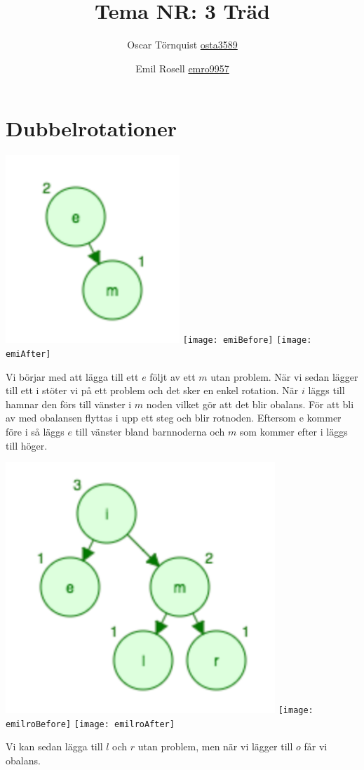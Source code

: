 \documentclass[a5paper,10pt,oneside]{article}
\title{Tema NR: 3 Träd}
\author{Oscar Törnquist \url{osta3589} \and Emil Rosell \url{emro9957}}
\begin{document}
\maketitle

\section*{Dubbelrotationer}

\includegraphics[scale=0.7]{em}
\texttt{[image: emiBefore]}
\texttt{[image: emiAfter]}

Vi börjar med att lägga till ett $e$ följt av ett $m$ utan problem. När vi sedan lägger till ett i stöter vi på ett problem och det sker en enkel rotation. När $i$ läggs till hamnar den förs till vänster i $m$ noden vilket gör att det blir obalans. För att bli av med obalansen flyttas i upp ett steg och blir rotnoden. Eftersom e kommer före i så läggs $e$ till vänster bland barnnoderna och $m$ som kommer efter i läggs till höger. 

\includegraphics[scale=0.45]{emilr}
\texttt{[image: emilroBefore]}
\texttt{[image: emilroAfter]}

Vi kan sedan lägga till $l$ och $r$ utan problem, men när vi lägger till $o$ får vi obalans.
\end{document}
